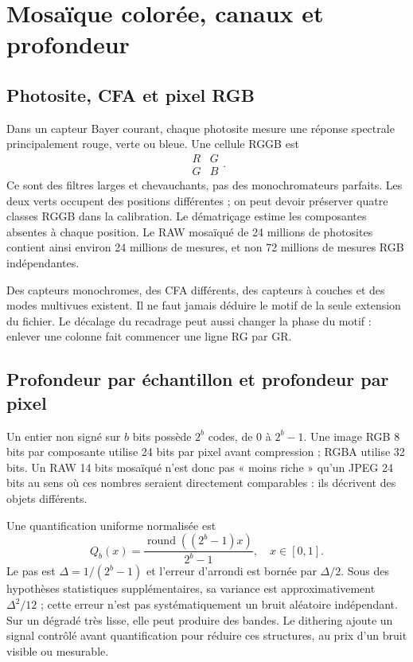 \section{Mosaïque colorée, canaux et profondeur}
\subsection{Photosite, CFA et pixel RGB}
Dans un capteur Bayer courant, chaque photosite mesure une réponse
spectrale principalement rouge, verte ou bleue. Une cellule RGGB est
\[
\begin{matrix}R&G\\G&B\end{matrix}.
\]
Ce sont des filtres larges et chevauchants, pas des monochromateurs
parfaits. Les deux verts occupent des positions différentes ; on
peut devoir préserver quatre classes RGGB dans la calibration.
Le dématriçage estime les composantes absentes à chaque position.
Le RAW mosaïqué de 24 millions de photosites contient ainsi environ
24 millions de mesures, et non 72 millions de mesures RGB indépendantes.

Des capteurs monochromes, des CFA différents, des capteurs à couches
et des modes multivues existent. Il ne faut jamais déduire le motif
de la seule extension du fichier. Le décalage du recadrage peut aussi
changer la phase du motif : enlever une colonne fait commencer une
ligne RG par GR.

\subsection{Profondeur par échantillon et profondeur par pixel}
Un entier non signé sur $b$ bits possède $2^b$ codes, de 0 à $2^b-1$.
Une image RGB 8 bits par composante utilise 24 bits par pixel avant
compression ; RGBA utilise 32 bits. Un RAW 14 bits mosaïqué n'est
donc pas « moins riche » qu'un JPEG 24 bits au sens où ces nombres
seraient directement comparables : ils décrivent des objets différents.

Une quantification uniforme normalisée est
\begin{equation}
Q_b(x)=\frac{\operatorname{round}((2^b-1)x)}{2^b-1},\quad x\in[0,1].
\end{equation}
Le pas est $\Delta=1/(2^b-1)$ et l'erreur d'arrondi est bornée par
$\Delta/2$. Sous des hypothèses statistiques supplémentaires,
sa variance est approximativement $\Delta^2/12$ ; cette erreur n'est
pas systématiquement un bruit aléatoire indépendant. Sur un dégradé
très lisse, elle peut produire des bandes. Le dithering ajoute un
signal contrôlé avant quantification pour réduire ces structures,
au prix d'un bruit visible ou mesurable.

